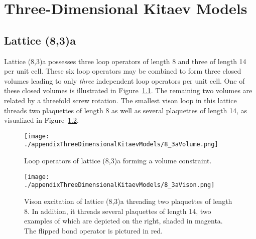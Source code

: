 \chapter{Three-Dimensional Kitaev Models}
\label{appendix:ThreeDimensionalKitaevModels}
%
%
\section{Lattice (8,3)a}
\label{appendix:ThreeDimensionalKitaevModels_8_3a}
%
%
Lattice (8,3)a possesses three loop operators of length 8 and three of length 14 per unit cell.
These six loop operators may be combined to form three closed volumes leading to only \textit{three} independent loop operators per unit cell.
One of these closed volumes is illustrated in Figure~\ref{fig:appendix_8_3aVolume}.
The remaining two volumes are related by a threefold screw rotation.
The smallest vison loop in this lattice threads two plaquettes of length 8 as well as several plaquettes of length 14, as visualized in Figure~\ref{fig:appendix_8_3aVison}.
%
\begin{figure}[ht!]
	\centering
	\texttt{[image: ./appendixThreeDimensionalKitaevModels/8\_3aVolume.png]}
	\caption{
		Loop operators of lattice (8,3)a forming a volume constraint.
	}
	\label{fig:appendix_8_3aVolume}
\end{figure}
%
%
\begin{figure}[ht!]
	\centering
	\texttt{[image: ./appendixThreeDimensionalKitaevModels/8\_3aVison.png]}
	\caption{
		Vison excitation of lattice (8,3)a threading two plaquettes of length 8.
		In addition, it threads several plaquettes of length 14, two examples of which are depicted on the right, shaded in magenta.
		The flipped bond operator is pictured in red.
	}
	\label{fig:appendix_8_3aVison}
\end{figure}
%


%
%
